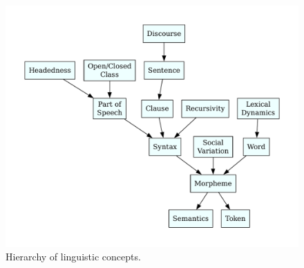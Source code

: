 \begin{figure}
  \centering
  \includegraphics[width=0.95\linewidth]{assets/linguistic-dag}
  \caption{Hierarchy of linguistic concepts.}
\end{figure}

